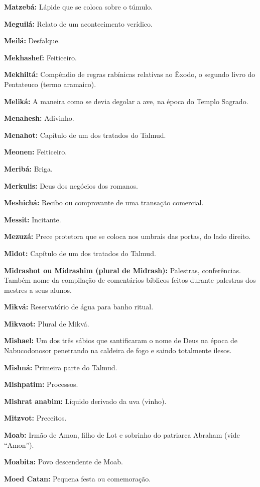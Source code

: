 \begin{hangparas}{.25in}{1}
{\textbf{Matzebá:} Lápide que se coloca sobre o túmulo.

\textbf{Meguilá:} Relato de um acontecimento verídico.

\textbf{Meilá:} Desfalque.

\textbf{Mekhashef:} Feiticeiro.

\textbf{Mekhiltá:} Compêndio de regras rabínicas relativas ao Êxodo, o
segundo livro do Pentateuco (termo aramaico).

\textbf{Meliká:} A maneira como se devia degolar a ave, na época do Templo Sagrado.

\textbf{Menahesh:} Adivinho.

\textbf{Menahot:} Capítulo de um dos tratados do Talmud.

\textbf{Meonen:} Feiticeiro.

\textbf{Meribá:} Briga.

\textbf{Merkulis:} Deus dos negócios dos romanos.

\textbf{Meshichá:} Recibo ou comprovante de uma transação comercial.

\textbf{Messit:} Incitante.

\textbf{Mezuzá:} Prece protetora que se coloca nos umbrais das portas,
do lado direito.

\textbf{Midot:} Capítulo de um dos tratados do Talmud.

\textbf{Midrashot ou Midrashim (plural de Midrash):} Palestras,
conferências. Também nome da compilação de comentários bíblicos feitos
durante palestras dos mestres a seus alunos.

\textbf{Mikvá:} Reservatório de água para banho ritual.

\textbf{Mikvaot:} Plural de Mikvá.

\textbf{Mishael:} Um dos três sábios que santificaram o nome de Deus na
época de Nabucodonosor penetrando na caldeira de fogo e saindo
totalmente ilesos.

\textbf{Mishná:} Primeira parte do Talmud.

\textbf{Mishpatim:} Processos.

\textbf{Mishrat anabim:} Líquido derivado da uva (vinho).

\textbf{Mitzvot:} Preceitos.

\textbf{Moab:} Irmão de Amon, filho de Lot e sobrinho do patriarca
Abraham (vide ``Amon'').

\textbf{Moabita:} Povo descendente de Moab.

\textbf{Moed Catan:} Pequena festa ou comemoração.

}
\end{hangparas}

